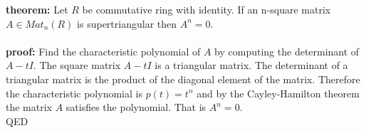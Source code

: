 \documentclass[12pt]{article}
\begin{document}
\textbf{theorem:}  Let $R$ be commutative ring with identity.
If an n-square matrix $A \in Mat_{n}(R)$
 is supertriangular then $A^n = 0$.\\\\
\textbf{proof:}  Find the characteristic polynomial of $A$ by computing the determinant of $A-tI$.  The square matrix $A-tI$ is a triangular matrix.  The determinant of a triangular matrix is the product of the diagonal element of the matrix.  Therefore the characteristic polynomial is $p(t) =t^n$ and by the Cayley-Hamilton theorem the matrix $A$ satisfies the polynomial.  That is $A^n = 0$.\\
QED
\end{document}
